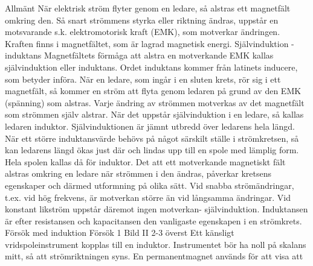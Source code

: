Allmänt
När elektrisk ström flyter genom en ledare,
så alstras ett magnetfält omkring den. Så
snart strömmens styrka eller riktning ändras,
uppstår en motsvarande s.k. elektromotorisk kraft (EMK), som motverkar ändringen.
Kraften finns i magnetfältet, som är lagrad
magnetisk energi.
Självinduktion - induktans
Magnetfältets förmåga att alstra en motverkande EMK kallas självinduktion eller induktans. Ordet induktans kommer från latinets
inducere, som betyder införa.
När en ledare, som ingår i en sluten krets,
rör sig i ett magnetfält, så kommer en ström
att flyta genom ledaren på grund av den
EMK (spänning) som alstras. Varje ändring
av strömmen motverkas av det magnetfält
som strömmen själv alstrar.
När det uppstår självinduktion i en ledare,
så kallas ledaren induktor. Självinduktionen
är jämnt utbredd över ledarens hela längd.
När ett större induktansvärde behövs på
något särskilt ställe i strömkretsen, så kan
ledarens längd ökas just där och lindas upp
till en spole med lämplig form. Hela spolen
kallas då för induktor.
Det att ett motverkande magnetiskt fält
alstras omkring en ledare när strömmen i
den ändras, påverkar kretsens egenskaper
och därmed utformning på olika sätt. Vid
snabba strömändringar, t.ex. vid hög frekvens, är motverkan större än vid långsamma
ändringar. Vid konstant likström uppstår
däremot ingen motverkan- självinduktion.
Induktansen är efter resistansen och
kapacitansen den vanligaste egenskapen i
en strömkrets.
Försök med induktion
Försök 1
Bild II 2-3 överst
Ett känsligt vridspoleinstrument kopplas till
en induktor. Instrumentet bör ha noll på
skalans mitt, så att strömriktningen syns. En
permanentmagnet används för att visa att

